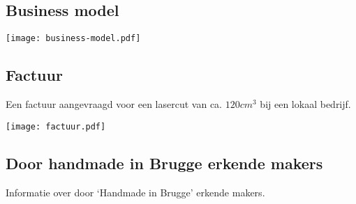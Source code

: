 
\subsection{Business model} %
\label{sub:business_model}

\texttt{[image: business-model.pdf]}


\subsection{Factuur} %
\label{sub:factuur}

Een factuur aangevraagd voor een lasercut van ca. $120cm^3$ bij een lokaal bedrijf.

\begin{centering}
  \texttt{[image: factuur.pdf]}
\end{centering}


\subsection{Door handmade in Brugge erkende makers} %
\label{sub:door_handmade_in_brugge_erkende_makers}

Informatie over door `Handmade in Brugge' erkende makers\cite{handmade-makers}.

